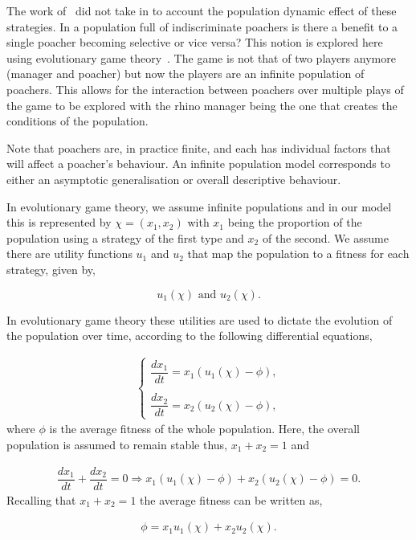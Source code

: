 \documentclass[10pt]{article}
\begin{document}
The work of~\cite{Lee} did not take in to account the population dynamic effect
of these strategies. In a population full of indiscriminate poachers is there
a benefit to a single poacher becoming selective or vice versa? This notion
is explored here using evolutionary game theory~\cite{Smith}. The
game is not that of two players anymore (manager and poacher) but now the players
are an infinite population of poachers. This allows for the interaction between
poachers over multiple plays of the game to be explored with the rhino manager
being the one that creates the conditions of the population.

Note that poachers are, in practice finite, and each has individual factors that will
affect a poacher's behaviour. An infinite population model corresponds to either
an asymptotic generalisation or overall descriptive behaviour.

In evolutionary game theory, we assume infinite populations and in our
model this is represented by \(\chi=(x_1, x_2)\) with \(x_1\) being the proportion
of the population using a strategy of the first type and \(x_2\) of the second. We
assume there are utility functions \(u_1\) and \(u_2\) that map the population
to a fitness for each strategy, given by,

\[ u_1(\chi)  \text{ and } u_2(\chi).\] 

In evolutionary game theory these utilities are used to dictate the evolution of
the population over time, according to the following differential equations,

\begin{eqnarray}
    \label{eqn:u_differential_eq}
    \left\{
    \begin{array}{cl}
    \dfrac{dx_1}{dt}=x_1(u_1(\chi)-\phi),
    \\
    \\
    \dfrac{dx_2}{dt}= x_2(u_2(\chi)-\phi),
    \end{array} \right.
\end{eqnarray}
where \(\phi\) is the average fitness of the whole population. Here, the overall
population is assumed to remain stable thus, \(x_1 + x_2 = 1 \) and

\begin{eqnarray}
    \dfrac{dx_1}{dt}  + \dfrac{dx_2}{dt} = 0 \Rightarrow x_1(u_1(\chi) - \phi)
     + x_2(u_2(\chi) - \phi)=0.
\end{eqnarray} 
Recalling that \(x_1 + x_2 = 1\) the average fitness can be written as,

\begin{eqnarray}
\label{eqn:average_fitness}
    \phi=x_1u_1(\chi) + x_2u_2(\chi).
\end{eqnarray}
\end{document}
